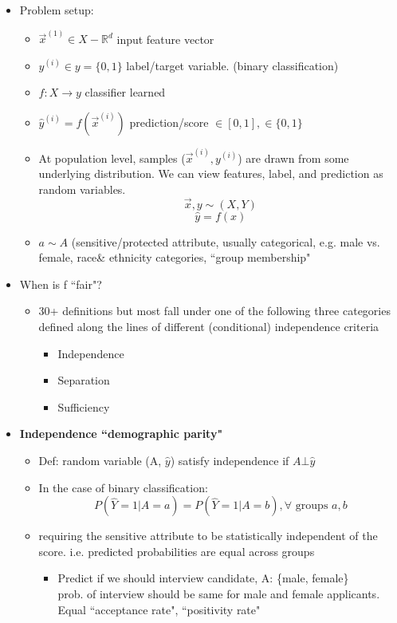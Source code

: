 \documentclass[10pt, oneside]{article}
\newcommand{\R}{\mathbb{R}}
\begin{document}
\begin{itemize}
    \item Problem setup:
    \begin{itemize}
        \item $\vec x^{(1)} \in X - \R^d$ input feature vector
        \item $y^{(i)} \in y = \{0,1\}$ label/target variable. (binary classification)
        \item $f: X\rightarrow y$ classifier learned
        \item $\hat y^{(i)} = f(\vec x^{(i)})$ prediction/score $\in [0,1], \in \{0,1\}$
        \item At population level, samples ($\vec x^{(i)}, y^{(i)}$) are drawn from some underlying distribution. We can view features, label, and prediction as random variables.
        \[\vec x, y \sim (X,Y)\]
        \[\hat y = f(x)\]
        \item $a \sim A$ (sensitive/protected attribute, usually categorical, e.g. male vs. female, race\& ethnicity categories, ``group membership"
    \end{itemize}
    \item When is f ``fair"?
    \begin{itemize}
        \item 30+ definitions but most fall under one of the following three categories defined along the lines of different (conditional) independence criteria
        \begin{itemize}
            \item Independence
            \item Separation
            \item Sufficiency
        \end{itemize}
    \end{itemize}
    \item \textbf{Independence ``demographic parity"}
    \begin{itemize}
        \item Def: random variable (A, $\hat y$) satisfy independence if $A \bot \hat y$
        \item In the case of binary classification:\[P(\hat Y = 1| A=a) = P(\hat Y = 1 | A = b), \forall\text{ groups }a,b\]
        \item requiring the sensitive attribute to be statistically independent of the score. i.e. predicted probabilities are equal across groups
        \begin{itemize}
            \item Predict if we should interview candidate, A: \{male, female\}\\prob. of interview should be same for male and female applicants. Equal ``acceptance rate", ``positivity rate"

\end{itemize}
\end{itemize}
\end{itemize}
\end{document}
